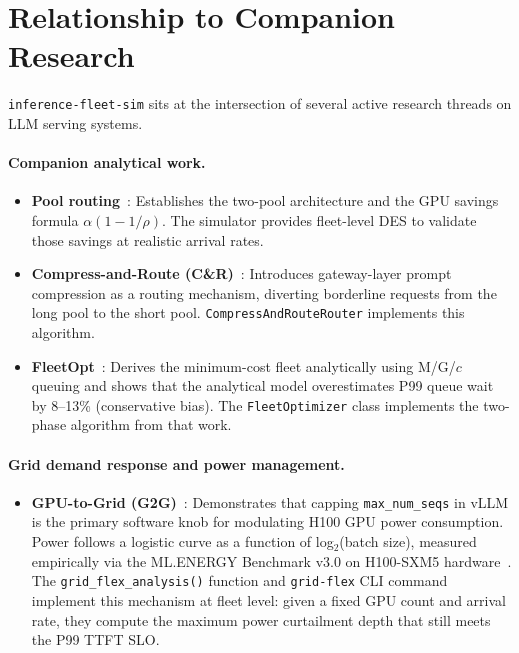 \documentclass[11pt,a4paper]{article}
\begin{document}
\section{Relationship to Companion Research}
\label{sec:papers}

\texttt{inference-fleet-sim} sits at the intersection of several active
research threads on LLM serving systems.

\paragraph{Companion analytical work.}
\begin{itemize}[nosep]
  \item \textbf{Pool routing}~\citep{chen2026poolrouting}: Establishes
    the two-pool architecture and the GPU savings formula
    $\alpha(1 - 1/\rho)$.  The simulator provides fleet-level DES to
    validate those savings at realistic arrival rates.
  \item \textbf{Compress-and-Route (C\&R)}~\citep{chen2026car}:
    Introduces gateway-layer prompt compression as a routing mechanism,
    diverting borderline requests from the long pool to the short pool.
    \texttt{CompressAndRouteRouter} implements this algorithm.
  \item \textbf{FleetOpt}~\citep{chen2026fleetopt}: Derives the
    minimum-cost fleet analytically using M/G/$c$ queuing and shows that
    the analytical model overestimates P99 queue wait by 8--13\%
    (conservative bias).  The \texttt{FleetOptimizer} class implements
    the two-phase algorithm from that work.
\end{itemize}

\paragraph{Grid demand response and power management.}
\begin{itemize}[nosep]
  \item \textbf{GPU-to-Grid (G2G)}~\citep{hassan2025g2g}:
    Demonstrates that capping \texttt{max\_num\_seqs} in vLLM is the
    primary software knob for modulating H100 GPU power consumption.
    Power follows a logistic curve as a function of log$_2$(batch size),
    measured empirically via the ML.ENERGY Benchmark v3.0 on H100-SXM5
    hardware~\citep{chung2025mlenergy}.  The \texttt{grid\_flex\_analysis()}
    function and \texttt{grid-flex} CLI command implement this mechanism at
    fleet level: given a fixed GPU count and arrival rate, they compute the
    maximum power curtailment depth that still meets the P99 TTFT SLO.
\end{itemize}
\end{document}
